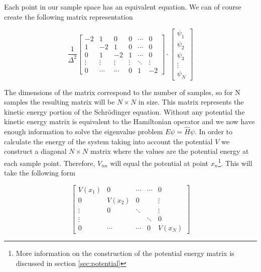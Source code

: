 \documentclass[authoryearcitations]{UoYCSproject}
\begin{document}
Each point in our sample space has an equivalent equation. We can of course create the following matrix representation

\begin{equation}
\frac{1}{\Delta ^2}\begin{bmatrix}
                -2     &   1    &     0    &     0   & \cdots & 0 \\
                1      &  -2    &     1    &     0   & \cdots & 0 \\
                0      &   1    &    -2    &     1   & \cdots & 0 \\
                \vdots & \vdots &   \vdots & \vdots  & \ddots & \vdots \\
                0      & \cdots &    \cdots     &     0   &    1   & -2
              \end{bmatrix}\cdot \begin{bmatrix} 
                                        \psi _1  \\
                                        \psi _{2}  \\
                                        \psi _{3} \\
                                        \vdots    \\
                                        \psi _{N} 
                                   \end{bmatrix}
\label{eq:kinetic}
\end{equation}

The dimensions of the matrix correspond to the number of samples, so for N samples the resulting matrix will be
$N \times N$ in size. This matrix represents the kinetic energy portion of the Schr\"{o}dinger equation. Without
any potential the kinetic energy matrix is equivalent to the Hamiltonian operator and we now have enough information
to solve the eigenvalue problem $E\psi = \hat{H}\psi$. In order to calculate the energy of the system taking into 
account the potential $V$ we construct a diagonal $N \times N$ matrix where the values are the potential energy at each sample
point. Therefore, $V_{nn}$ will equal the potential at point $x_{n}$\footnote{More information on the construction of
the potential energy matrix is discussed in section \ref{sec:potential}}. This will take the following form

\begin{equation}
\begin{bmatrix}
                V(x_1) &   0     &   \cdots & \cdots &     0 \\
                0      &  V(x_2) &    0     &        &  \vdots \\
                \vdots &   0     &   \ddots &        &  \vdots \\
                \vdots &         &          & \ddots &     0 \\
                0      & \cdots  &   \cdots &   0    &   V(x_N)
              \end{bmatrix}
\label{eq:potential}
\end{equation}
\end{document}

